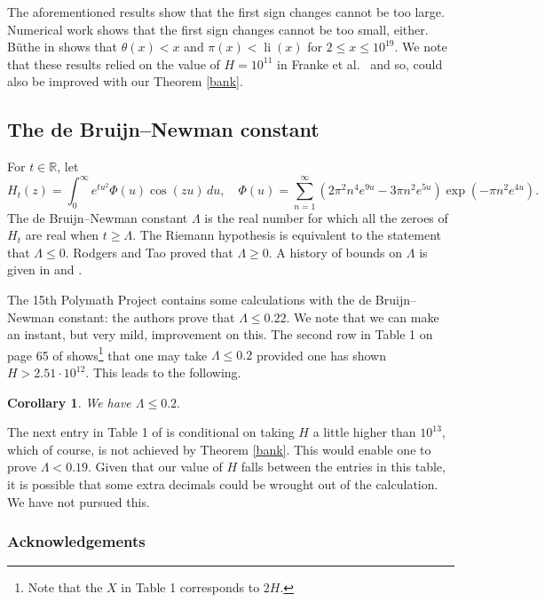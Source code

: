 \documentclass[12pt]{article}
\newtheorem{cor}{Corollary}
\DeclareMathOperator{\li}{li}
\begin{document}
The aforementioned results show that the first sign changes cannot be too large. Numerical work shows that the first sign changes cannot be too small, either. B\"{u}the in \cite{Booth2} shows that $\theta(x) <x$ and $\pi(x) < \li(x)$ for $2\leq x\leq10^{19}$. We note that these results relied on the value of $H=10^{11}$ in Franke et al.\ \cite{Frank} and so, could also be improved with our Theorem \ref{bank}.
\subsection{The de Bruijn--Newman constant}
For $t\in \mathbb{R}$, let
\begin{equation*}
H_{t}(z)= \int_{0}^{\infty} e^{t u^{2}} \Phi(u) \cos(zu)\, du, \quad  \Phi(u) = \sum_{n=1}^{\infty} \left( 2 \pi^{2} n^{4} e^{9u} - 3\pi n^{2} e^{5u}\right) \exp\left(-\pi n^{2} e^{4u}\right).
\end{equation*}
The de Bruijn--Newman constant $\Lambda$ is the real number for which all the zeroes of $H_{t}$ are real when $t\geq \Lambda$. 
%
The Riemann hypothesis is equivalent to the statement that $\Lambda \leq 0$. Rodgers and Tao \cite{RT} proved that $\Lambda \geq 0$. A history of  bounds on $\Lambda$ is given in \cite{RT} and \cite{Poly}. 

The 15th Polymath Project \cite{Poly} contains some calculations with the de Bruijn--Newman constant: the authors prove that $\Lambda \leq 0.22$. We note that we can make an instant, but very mild, improvement on this. The second row in Table 1 on page 65 of \cite{Poly} shows\footnote{Note that the $X$ in Table 1 corresponds to $2H$. } that one may take $\Lambda \leq 0.2$ provided one has shown $H> 2.51\cdot 10^{12}$. This leads to the following.
\begin{cor}
We have $\Lambda \leq 0.2.$
\end{cor}

The next entry in Table 1 of \cite{Poly} is conditional on taking $H$ a little higher than $10^{13}$, which of course, is not achieved by Theorem \ref{bank}. This would enable one to prove $\Lambda < 0.19$. Given that our value of $H$ falls between the entries in this table, it is possible that some extra decimals could be wrought out of the calculation. We have not pursued this.




\subsubsection*{Acknowledgements}
\end{document}
